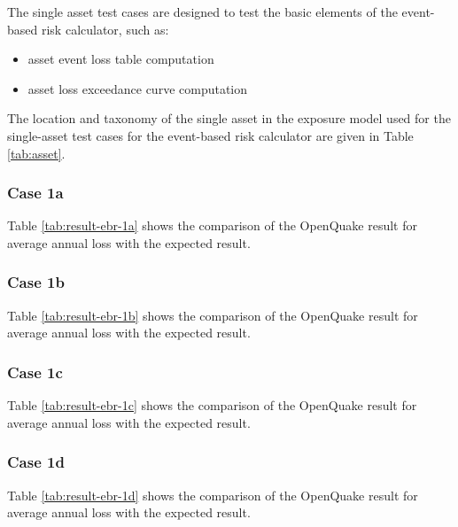 The single asset test cases are designed to test the basic elements of the event-based risk calculator, such as:

\begin{itemize}
\item asset event loss table computation
\item asset loss exceedance curve computation
\end{itemize}

The location and taxonomy of the single asset in the exposure model used for the single-asset test cases for the event-based risk calculator are given in Table \ref{tab:asset}.

\subsubsection{Case 1a}


Table \ref{tab:result-ebr-1a} shows the comparison of the OpenQuake result for average annual loss with the expected result.

\subsubsection{Case 1b}


Table \ref{tab:result-ebr-1b} shows the comparison of the OpenQuake result for average annual loss with the expected result.

\subsubsection{Case 1c}


Table \ref{tab:result-ebr-1c} shows the comparison of the OpenQuake result for average annual loss with the expected result.
\subsubsection{Case 1d}


Table \ref{tab:result-ebr-1d} shows the comparison of the OpenQuake result for average annual loss with the expected result.

